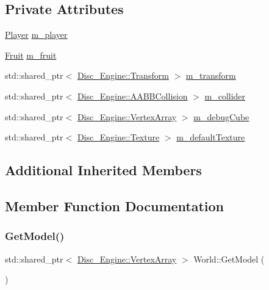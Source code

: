 \subsection*{Private Attributes}
\begin{DoxyCompactItemize}
\item 
\mbox{\hyperlink{class_player}{Player}} \mbox{\hyperlink{class_world_ae983a13c169f3dbd4cbe0cbb0e0f6739}{m\+\_\+player}}
\item 
\mbox{\hyperlink{class_fruit}{Fruit}} \mbox{\hyperlink{class_world_a3558a6a064be3565ee8835a34da58d4d}{m\+\_\+fruit}}
\item 
std\+::shared\+\_\+ptr$<$ \mbox{\hyperlink{class_disc___engine_1_1_transform}{Disc\+\_\+\+Engine\+::\+Transform}} $>$ \mbox{\hyperlink{class_world_a13c7bbabeb92dae015b76b582bac8084}{m\+\_\+transform}}
\item 
std\+::shared\+\_\+ptr$<$ \mbox{\hyperlink{class_disc___engine_1_1_a_a_b_b_collision}{Disc\+\_\+\+Engine\+::\+A\+A\+B\+B\+Collision}} $>$ \mbox{\hyperlink{class_world_abb8264e9716aeb6867745f5defdb5e55}{m\+\_\+collider}}
\item 
std\+::shared\+\_\+ptr$<$ \mbox{\hyperlink{class_disc___engine_1_1_vertex_array}{Disc\+\_\+\+Engine\+::\+Vertex\+Array}} $>$ \mbox{\hyperlink{class_world_a59bc35e219814aa69f7535ffff5f56c3}{m\+\_\+debug\+Cube}}
\item 
std\+::shared\+\_\+ptr$<$ \mbox{\hyperlink{class_disc___engine_1_1_texture}{Disc\+\_\+\+Engine\+::\+Texture}} $>$ \mbox{\hyperlink{class_world_ae7e5b1953918b63b9fbb2c7a2c5d82d6}{m\+\_\+default\+Texture}}
\end{DoxyCompactItemize}
\subsection*{Additional Inherited Members}


\subsection{Member Function Documentation}
\mbox{\label{class_world_ae19fd1fd5943772a8e0e95cc8a90fef8}} 
\subsubsection{\texorpdfstring{Get\+Model()}{GetModel()}}
{\footnotesize\ttfamily std\+::shared\+\_\+ptr$<$ \mbox{\hyperlink{class_disc___engine_1_1_vertex_array}{Disc\+\_\+\+Engine\+::\+Vertex\+Array}} $>$ World\+::\+Get\+Model (\begin{DoxyParamCaption}{ }\end{DoxyParamCaption})}


